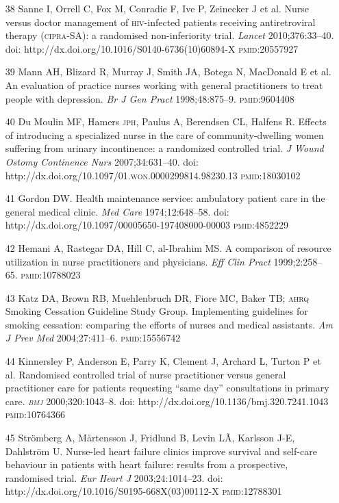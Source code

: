 \documentclass{article}
\begin{document}
\begin{itemize}
\item[38] Sanne I, Orrell C, Fox M, Conradie F, Ive P, Zeinecker J et al. Nurse
versus doctor
management of \textsc{hiv}-infected patients receiving antiretroviral therapy (\textsc{cipra}-SA):
a randomised
non-inferiority trial. \textit{Lancet}
2010;376:33–40. doi:
http://dx.doi.org/10.1016/S0140-6736(10)60894-X \textsc{pmid}:20557927

\item[39] Mann AH, Blizard R, Murray J, Smith JA, Botega N, MacDonald E et al.
An evaluation
of practice nurses working with general practitioners to treat people with
depression. \textit{Br J
Gen Pract}
1998;48:875–9. \textsc{pmid}:9604408

\item[40] Du Moulin MF, Hamers \textsc{jph}, Paulus A, Berendsen CL, Halfens R. Effects
of introducing
a specialized nurse in the care of community-dwelling women suffering from
urinary incontinence: a
randomized controlled trial. \textit{J Wound Ostomy Continence Nurs}
2007;34:631–40. doi:
http://dx.doi.org/10.1097/01.\textsc{won}.0000299814.98230.13 \textsc{pmid}:18030102

\item[41] Gordon DW. Health maintenance service: ambulatory patient care in the
general
medical clinic. \textit{Med Care}
1974;12:648–58. doi:
http://dx.doi.org/10.1097/00005650-197408000-00003 \textsc{pmid}:4852229

\item[42] Hemani A, Rastegar DA, Hill C, al-Ibrahim MS. A comparison of resource
utilization
in nurse practitioners and physicians. \textit{Eff Clin Pract}
1999;2:258–65.
\textsc{pmid}:10788023

\item[43] Katz DA, Brown RB, Muehlenbruch DR, Fiore MC, Baker TB; \textsc{ahrq} Smoking
Cessation
Guideline Study Group. Implementing guidelines for smoking cessation: comparing
the efforts of
nurses and medical assistants. \textit{Am J Prev Med}
2004;27:411–6.
\textsc{pmid}:15556742

\item[44] Kinnersley P, Anderson E, Parry K, Clement J, Archard L, Turton P et
al. Randomised
controlled trial of nurse practitioner versus general practitioner care for
patients requesting
“same day” consultations in primary care. \textit{\textsc{bmj}}
2000;320:1043–8. doi:
http://dx.doi.org/10.1136/bmj.320.7241.1043 \textsc{pmid}:10764366

\item[45] Strömberg A, Mårtensson J, Fridlund B, Levin LÃ, Karlsson J-E,
Dahlström U. Nurse-led heart failure clinics improve survival and self-care
behaviour in
patients with heart failure: results from a prospective, randomised trial.
\textit{Eur Heart
J}
2003;24:1014–23. doi: http://dx.doi.org/10.1016/S0195-668X(03)00112-X
\textsc{pmid}:12788301


\end{itemize}
\end{document}
